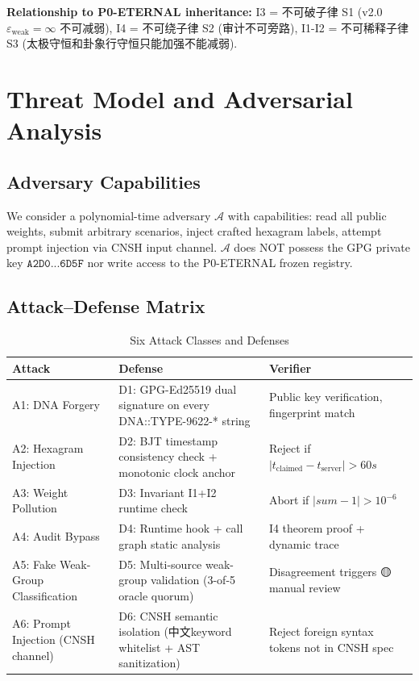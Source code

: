 \documentclass[conference]{IEEEtran}
\begin{document}
\noindent\textbf{Relationship to P0-ETERNAL inheritance:}
I3 = 不可破子律 S1 (v2.0 $\varepsilon_{\text{weak}}=\infty$ 不可减弱),
I4 = 不可绕子律 S2 (审计不可旁路),
I1-I2 = 不可稀释子律 S3 (太极守恒和卦象行守恒只能加强不能减弱).

\section{Threat Model and Adversarial Analysis}
\label{sec:threat}

\subsection{Adversary Capabilities}
We consider a polynomial-time adversary $\mathcal{A}$
with capabilities: read all public weights, submit
arbitrary scenarios, inject crafted hexagram labels,
attempt prompt injection via CNSH input channel.
$\mathcal{A}$ does NOT possess the GPG private key
$\texttt{A2D0...6D5F}$ nor write access to the
P0-ETERNAL frozen registry.

\subsection{Attack--Defense Matrix}
\begin{table}[h]
\caption{Six Attack Classes and Defenses}
\label{tab:threat}
\begin{tabular}{p{2.4cm}p{2.4cm}p{2.4cm}}
\toprule
\textbf{Attack} & \textbf{Defense} & \textbf{Verifier} \\
\midrule
A1: DNA Forgery
  & D1: GPG-Ed25519 dual signature on every
    DNA::TYPE-9622-* string
  & Public key verification, fingerprint match \\
A2: Hexagram Injection
  & D2: BJT timestamp consistency check
    + monotonic clock anchor
  & Reject if $|t_{\text{claimed}} - t_{\text{server}}| > 60s$ \\
A3: Weight Pollution
  & D3: Invariant I1+I2 runtime check
  & Abort if $|sum - 1| > 10^{-6}$ \\
A4: Audit Bypass
  & D4: Runtime hook + call graph static analysis
  & I4 theorem proof + dynamic trace \\
A5: Fake Weak-Group Classification
  & D5: Multi-source weak-group validation
    (3-of-5 oracle quorum)
  & Disagreement triggers 🟡 manual review \\
A6: Prompt Injection (CNSH channel)
  & D6: CNSH semantic isolation (中文keyword
    whitelist + AST sanitization)
  & Reject foreign syntax tokens
    not in CNSH spec \\
\bottomrule
\end{tabular}
\end{table}
\end{document}
